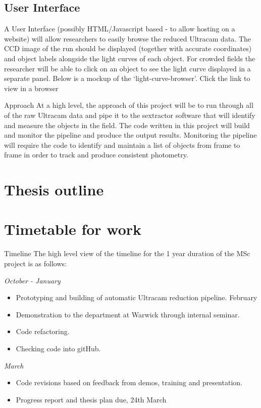 \documentclass[a4paper,10pt]{article}
\begin{document}
\subsection{User Interface}
A User Interface (possibly HTML/Javascript based - to allow hosting on a website) will allow researchers to easily browse the reduced Ultracam data. The CCD image of the run should be displayed (together with accurate coordinates) and object labels alongside the light curves of each object. For crowded fields the researcher will be able to click on an object to see the light curve displayed in a separate panel. Below is a mockup of the ‘light-curve-browser’.
Click the link to view in a browser


Approach
At a high level, the approach of this project will be to 
run through all of the raw Ultracam data and pipe it to the 
sextractor software that will identify and measure the objects in 
the field. The code written in this project will build and monitor 
the pipeline and produce the output results. Monitoring the pipeline 
will require the code to identify and maintain a list of objects 
from frame to frame in order to track and produce consistent 
photometry. 





\section{Thesis outline}

\section{Timetable for work}

Timeline 
The high level view of the timeline for the 1 year duration of the MSc project is as follows:

\emph{October - January}
\begin{itemize} 
	\item Prototyping and building of automatic Ultracam reduction pipeline.
February
	\item Demonstration to the department at Warwick through internal seminar.
	\item Code refactoring.
	\item Checking code into gitHub.
\end{itemize}

\emph{March}
\begin{itemize} 
	\item Code revisions based on feedback from demos, training and presentation.
	\item Progress report and thesis plan due, 24th March
\end{itemize}
\end{document}
